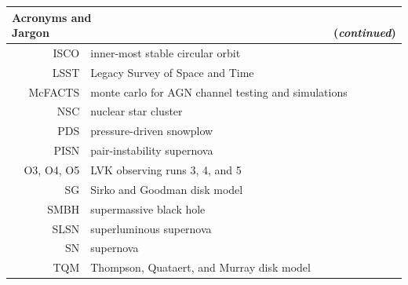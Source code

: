 \begin{tabular}{rl}
\toprule
\multicolumn{2}{l}{\textbf{Acronyms and Jargon~~~~~~~~~~~~~~~~~~~~~~~~~~~~~~~~~~~~~~~~~~~~~(\textit{continued})}} \\
\midrule
ISCO & inner-most stable circular orbit \\
LSST & Legacy Survey of Space and Time \\
McFACTS & monte carlo for AGN channel testing and simulations \\
NSC & nuclear star cluster \\
PDS & pressure-driven snowplow \\
PISN & pair-instability supernova \\
O3, O4, O5 & LVK observing runs 3, 4, and 5 \\
SG & Sirko and Goodman disk model \\
SMBH & supermassive black hole \\
SLSN & superluminous supernova \\
SN & supernova \\
TQM & Thompson, Quataert, and Murray disk model \\
\bottomrule
\end{tabular}
